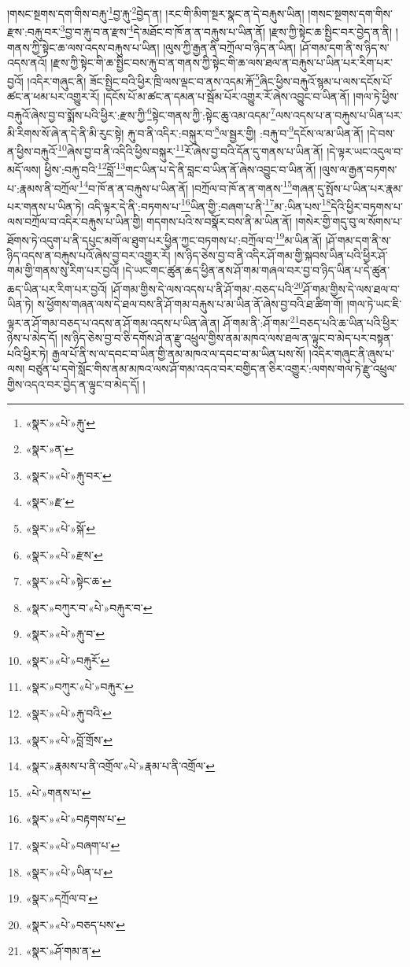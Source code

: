 །གསང་སྔགས་དག་གིས་བརྐུ་\footnote{«སྣར་»«པེ་»རྐུ་}བྱ་རྐུ་\footnote{«སྣར་»ན་}བྱེད་ན། །རང་གི་མིག་སྔར་སྣང་ན་དེ་བརྐུས་ཡིན། །གསང་སྔགས་དག་གིས་རྫས་:བརྐུ་བར་\footnote{«སྣར་»«པེ་»རྐུ་བར་}བྱ་བ་རྐུ་བ་ན་རྫས་\footnote{«སྣར་»རྫ་}དེ་མཐོང་བ་ཁོ་ན་ན་བརྐུས་པ་ཡིན་ནོ། །རྫས་ཀྱི་སྟེང་ཆ་སྤྱིང་བར་བྱེད་ན་ནི། །གནས་ཀྱི་སྟེང་ཆ་ལས་འདས་བརྐུས་པ་ཡིན། །ལུས་ཀྱི་རྒྱན་ནི་བཀྲོལ་བ་ཉིད་ན་ཡིན། །ཤོ་གམ་དག་ནི་ས་ཉིད་ས་འདས་ནའོ། །རྫས་ཀྱི་སྟེང་གི་ཆ་སྤྱིང་བས་རྐུ་བ་ན་གནས་ཀྱི་སྟེང་གི་ཆ་ལས་ཐལ་ན་བརྐུས་པ་ཡིན་པར་རིག་པར་བྱའོ། །འདིར་གཞུང་ནི། ཟོང་སྤྱིང་བའི་ཕྱིར་ཁྲི་ལས་ལྡང་བ་ནས་འདམ་རྐོ་\footnote{«སྣར་»«པེ་»སྐོ་}ཞིང་ཕྱིས་བརྐུའོ་སྙམ་པ་ལས་དངོས་པོ་ཚང་ན་ཕམ་པར་འགྱུར་རོ། །དངོས་པོ་མ་ཚང་ན་དམན་པ་སྦོམ་པོར་འགྱུར་རོ་ཞེས་འབྱུང་བ་ཡིན་ནོ། །གལ་ཏེ་ཕྱིས་བརྐུའོ་ཞེས་བྱ་བ་སྨོས་པའི་ཕྱིར་:རྫས་ཀྱི་\footnote{«སྣར་»«པེ་»རྫས་}སྟེང་གནས་ཀྱི་:སྟེང་ཆུ་འམ་འདམ་\footnote{«སྣར་»«པེ་»སྟེང་ཆ་}ལས་འདས་པ་ན་བརྐུས་པ་ཡིན་པར་མི་རིགས་སོ་ཞེ་ན་དེ་ནི་མི་རུང་སྟེ། རྐུ་བ་ནི་འདིར་:བསྐུར་བ་\footnote{«སྣར་»བཀུར་བ་«པེ་»བརྐུར་བ་}ལ་སྦྱར་གྱི། :བརྐུ་བ་\footnote{«སྣར་»«པེ་»རྐུ་བ་}དངོས་ལ་མ་ཡིན་ནོ། །དེ་བས་ན་ཕྱིས་བརྐུའོ་\footnote{«སྣར་»«པེ་»བརྐུརོ་}ཞེས་བྱ་བ་ནི་འདིའི་ཕྱིས་བསྐུར་\footnote{«སྣར་»བཀུར་«པེ་»བརྐུར་}རོ་ཞེས་བྱ་བའི་དོན་དུ་གནས་པ་ཡིན་ནོ། །དེ་ལྟར་ཡང་འདུལ་བ་མདོ་ལས། ཕྱིས་:བརྐུ་བའི་\footnote{«སྣར་»«པེ་»རྐུ་བའི་}བློ་\footnote{«སྣར་»«པེ་»བློ་གྲོས་}གང་ཡིན་པ་དེ་ནི་བླང་བ་ཡིན་ནོ་ཞེས་འབྱུང་བ་ཡིན་ནོ། །ལུས་ལ་རྒྱན་བཏགས་པ་:རྣམས་ནི་བཀྲོལ་\footnote{«སྣར་»རྣམས་པ་ནི་འགྲོལ་«པེ་»རྣམ་པ་ནི་འགྲོལ་}བ་ཁོ་ན་ན་བརྐུས་པ་ཡིན་ནོ། །བཀྲོལ་བ་ཁོ་ན་ན་གནས་\footnote{«པེ་»གནས་པ་}གཞན་དུ་སྤོས་པ་ཡིན་པར་རྣམ་པར་གནས་པ་ཡིན་ཏེ། འདི་ལྟར་དེ་ནི་:བཏགས་པ་\footnote{«སྣར་»«པེ་»བརྟགས་པ་}ཡིན་གྱི་:བཞག་པ་ནི་\footnote{«སྣར་»«པེ་»བཞག་པ་}མ་:ཡིན་པས་\footnote{«སྣར་»«པེ་»ཡིན་པ་}དེའི་ཕྱིར་བཏགས་པ་ལས་བཀྲོལ་བ་འདིར་བརྐུས་པ་ཡིན་གྱི། གདགས་པའི་ས་བསྣོར་བས་ནི་མ་ཡིན་ནོ། །གསེར་གྱི་གདུ་བུ་ལ་སོགས་པ་ཐོགས་ཏེ་འདུག་པ་ནི་དཔུང་མགོ་ལ་ཐུག་པར་ཕྱིན་ཀྱང་བཏགས་པ་:བཀྲོལ་བ་\footnote{«སྣར་»དཀྲོལ་བ་}མ་ཡིན་ནོ། །ཤོ་གམ་དག་ནི་ས་ཉིད་འདས་ན་བརྐུས་པའོ་ཞེས་བྱ་བར་འགྱུར་རོ། །ས་ཉིད་ཅེས་བྱ་བ་ནི་འདིར་ཤོ་གམ་གྱི་སྐབས་ཡིན་པའི་ཕྱིར་ཤོ་གམ་གྱི་གནས་སུ་རིག་པར་བྱའོ། །དེ་ཡང་གང་ཚུན་ཆད་ཕྱིན་ནས་ཤོ་གམ་གཞལ་བར་བྱ་བ་ཉིད་ཡིན་པ་དེ་ཚུན་ཆད་ཡིན་པར་རིག་པར་བྱའོ། །ཤོ་གམ་གྱིས་དེ་ལས་འདས་པ་ནི་ཤོ་གམ་:བཅད་པའི་\footnote{«སྣར་»«པེ་»བཅད་པས་}ཤོ་གམ་གྱིས་དེ་ལས་ཐལ་བ་ཡིན་ཏེ། ས་ཕྱོགས་གཞན་ལས་དེ་ཐལ་བས་ནི་ཤོ་གམ་བརྐུས་པ་མ་ཡིན་ནོ་ཞེས་བྱ་བའི་ཐ་ཚིག་གོ། །གལ་ཏེ་ཡང་ཇི་ལྟར་ན་ཤོ་གམ་བཅད་པ་འདས་ན་ཤོ་གམ་འདས་པ་ཡིན་ཞེ་ན། ཤོ་གམ་ནི་:ཤོ་གམ་\footnote{«སྣར་»ཤོ་གམ་ན་}བཅད་པའི་ཆ་ཡིན་པའི་ཕྱིར་ཉེས་པ་མེད་དོ། །ས་ཉིད་ཅེས་བྱ་བ་ཅི་དགོས་ཤེ་ན་རྫུ་འཕྲུལ་གྱིས་ནམ་མཁའ་ལས་ཐལ་ན་ལྟུང་བ་མེད་པར་བསྟན་པའི་ཕྱིར་ཏེ། རྒྱལ་པོ་ནི་ས་ལ་དབང་བ་ཡིན་གྱི་ནམ་མཁའ་ལ་དབང་བ་མ་ཡིན་པས་སོ། །འདིར་གཞུང་ནི་ཞུས་པ་ལས། བཙུན་པ་དགེ་སློང་གིས་ནམ་མཁའ་ལས་ཤོ་གམ་འདའ་བར་བགྱིད་ན་ཅིར་འགྱུར་:ལགས་གལ་ཏེ་རྫུ་འཕྲུལ་གྱིས་འདའ་བར་བྱེད་ན་ལྟུང་བ་མེད་དོ། །
